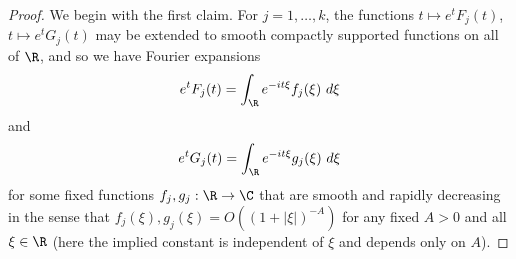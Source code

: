 \begin{proof}  We begin with the first claim.
For $j=1,\dots,k$, the functions $t \mapsto e^t F_j(t)$, $t \mapsto e^t G_j(t)$ may be extended to smooth compactly supported functions on all of $\R$, and so we have Fourier expansions
\begin{equation}\label{etf}
 e^t F_j(t) = \int_\R e^{-it\xi} f_j(\xi)\ d\xi
\end{equation}
and
$$ e^t G_j(t) = \int_\R e^{-it\xi} g_j(\xi)\ d\xi$$
for some fixed functions $f_j, g_j: \R \to \C$ that are smooth and rapidly decreasing in the sense that $f_j(\xi), g_j(\xi) = O( (1+|\xi|)^{-A} )$ for any fixed $A>0$ and all $\xi \in \R$ %
(here the implied constant is independent of $\xi$ and depends only on $A$).  


\end{proof}
